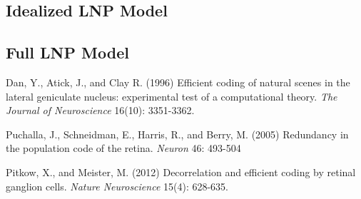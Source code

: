 \documentclass[12pt]{article}
\begin{document}
\subsection{Idealized LNP Model}

\subsection{Full LNP Model}



\newpage
\begin{thebibliography}{9}


 Dan, Y., Atick, J., and Clay R. (1996) Efficient coding of natural scenes in the lateral geniculate nucleus: experimental test of a computational theory. \textit{The Journal of Neuroscience} 16(10): 3351-3362.

 Puchalla, J., Schneidman, E., Harris, R., and Berry, M. (2005) Redundancy in the population code of the retina. \textit{Neuron} 46: 493-504

 Pitkow, X., and Meister, M. (2012) Decorrelation and efficient coding by retinal ganglion cells. \textit{Nature Neuroscience} 15(4): 628-635.


\end{thebibliography}
\end{document}
